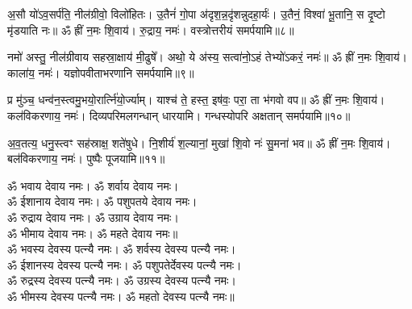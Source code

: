 अ॒सौ यो॑ऽव॒सर्प॑ति॒ नील॑ग्रीवो॒ विलो॑हितः। उ॒तैनं॑ गो॒पा अ॑दृश॒न्न॒दृ॑शन्नुदहा॒र्यः॑। उ॒तैनं॒ विश्वा॑ भू॒तानि॒ स दृ॒ष्टो मृ॑डयाति नः॥ ॐ ह्रीं न॒मः शि॒वाय॑। रु॒द्राय॒ नमः॑। वस्त्रोत्तरीयं समर्पयामि॥८॥

नमो॑ अस्तु॒ नील॑ग्रीवाय सहस्रा॒क्षाय॑ मी॒ढुषे᳚। अथो॒ ये अ॑स्य॒ सत्वा॑नो॒ऽहं तेभ्यो॑ऽकरं॒ नमः॑॥ ॐ ह्रीं न॒मः शि॒वाय॑। काला॑य॒ नमः॑। यज्ञोपवीताभरणानि समर्पयामि॥९॥

प्र मु॑ञ्च॒ धन्व॑न॒स्त्वमु॒भयो॒रार्त्नि॑यो॒र्ज्याम्। याश्च॑ ते॒ हस्त॒ इष॑वः॒ परा॒ ता भ॑गवो वप॥ ॐ ह्रीं न॒मः शि॒वाय॑। कल॑विकरणाय॒ नमः॑। दिव्यपरिमलगन्धान् धारयामि। गन्धस्योपरि अक्षतान् समर्पयामि॥१०॥

अ॒व॒तत्य॒ धनु॒स्त्वꣳ सह॑स्राक्ष॒ शते॑षुधे। नि॒शीर्य॑ श॒ल्यानां॒ मुखा॑ शि॒वो नः॑ सु॒मना॑ भव॥ ॐ ह्रीं न॒मः शि॒वाय॑। बल॑विकरणाय॒ नमः॑। पुष्पैः पूजयामि॥११॥


ॐ भवाय देवाय नमः। ॐ शर्वाय देवाय नमः। \\
ॐ ईशानाय देवाय नमः। ॐ पशुपतये देवाय नमः।\\
ॐ रुद्राय देवाय नमः। ॐ उग्राय देवाय नमः।\\
ॐ भीमाय देवाय नमः। ॐ महते देवाय नमः॥\\
ॐ भवस्य देवस्य पत्न्यै नमः। ॐ शर्वस्य देवस्य पत्न्यै नमः।\\
ॐ ईशानस्य देवस्य पत्न्यै नमः। ॐ पशुपतेर्देवस्य पत्न्यै नमः।\\
ॐ रुद्रस्य देवस्य पत्न्यै नमः। ॐ उग्रस्य देवस्य पत्न्यै नमः।\\
ॐ भीमस्य देवस्य पत्न्यै नमः। ॐ महतो देवस्य पत्न्यै नमः॥ \\

